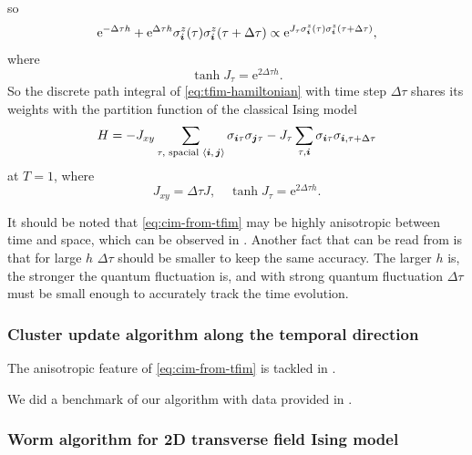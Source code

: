 \documentclass[hyperref, a4paper]{article}
\newcommand*{\ee}{\mathrm{e}}
\newcommand*{\pair}[1]{\langle #1 \rangle}
\newcommand*{\tfim}{transverse field Ising model}
\newcommand*{\cim}{classical Ising model}
\begin{document}
so 
\[
    \ee^{- \Delta \tau h} + \ee^{\Delta \tau h} \sigma^z_{\vb*{i}}(\tau) \sigma^z_{\vb*{i}}(\tau + \Delta \tau) \propto \ee^{J_\tau \sigma^z_{\vb*{i}}(\tau) \sigma^z_{\vb*{i}}(\tau + \Delta \tau)},
\]
where
\[
    \tanh J_\tau = \ee^{2 \Delta \tau h}.
\]
So the discrete path integral of \eqref{eq:tfim-hamiltonian} with time step $\Delta \tau$ shares its weights with the partition function of the \cim
\begin{equation}
    H = - J_{xy} \sum_{\tau, \text{ spacial $\pair{\vb*{i}, \vb*{j}}$}} \sigma_{\vb*{i} \tau} \sigma_{\vb*{j} \tau} - J_\tau \sum_{\tau, \vb*{i}} \sigma_{\vb*{i} \tau} \sigma_{\vb*{i}, \tau + \Delta \tau}
    \label{eq:cim-from-tfim} 
\end{equation}
at $T = 1$, where
\begin{equation}
    J_{xy} = \Delta \tau J, \quad \tanh J_\tau = \ee^{2 \Delta \tau h}.
\end{equation}

It should be noted that \eqref{eq:cim-from-tfim} may be highly anisotropic between time and space, 
which can be observed in .
Another fact that can be read from  is that for large $h$ $\Delta \tau$ should be smaller to keep the same accuracy.
The larger $h$ is, the stronger the quantum fluctuation is, 
and with strong quantum fluctuation $\Delta \tau$ must be small enough to accurately track the time evolution.

\subsubsection{Cluster update algorithm along the temporal direction}

The anisotropic feature of \eqref{eq:cim-from-tfim} is tackled in \cite{Blte2002}.

We did a benchmark of our algorithm with data provided in \cite{Friedman_1978}.

\subsubsection{Worm algorithm for 2D \tfim{}}
\end{document}
